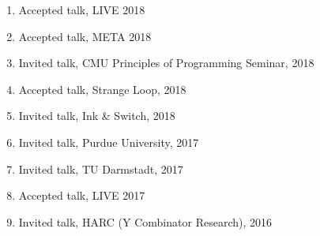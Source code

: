 \documentclass[10pt,letterpaper]{article}
\renewenvironment{itemize}{
  \begin{list}{}{
    \setlength{\leftmargin}{1.25em}
    \setlength{\itemsep}{0.25em}
    \setlength{\parskip}{0pt}
    \setlength{\parsep}{0.2em}
  }
}{
  \end{list}
}
\begin{document}
\begin{enumerate}
  \item Accepted talk, LIVE 2018
  \item Accepted talk, META 2018
  \item Invited talk, CMU Principles of Programming Seminar, 2018
  \item Accepted talk, Strange Loop, 2018
  \item Invited talk, Ink \& Switch, 2018
  \item Invited talk, Purdue University, 2017
  \item Invited talk, TU Darmstadt, 2017
  \item Accepted talk, LIVE 2017
  \item Invited talk, HARC (Y Combinator Research), 2016

\end{enumerate}
\end{document}
